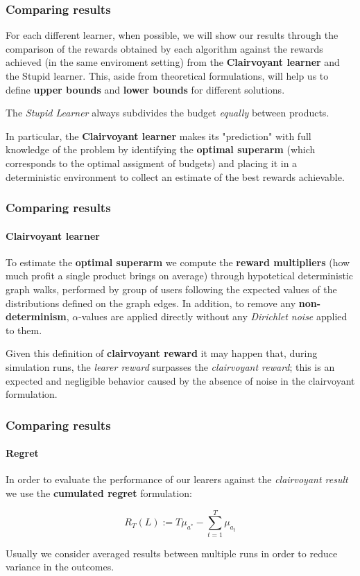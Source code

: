 
\begin{frame}

\frametitle{Comparing results}

For each different learner, when possible, we will show our results through the comparison of the rewards obtained by each algorithm against the rewards achieved (in the same enviroment setting) from the \textbf{Clairvoyant learner} and the Stupid learner.
This, aside from theoretical formulations, will help us to define \textbf{upper bounds} and \textbf{lower bounds} for different solutions.

The \textit{Stupid Learner} always subdivides the budget \textit{equally} between products.

In particular, the \textbf{Clairvoyant learner} makes its "prediction" with full knowledge of the problem by identifying the \textbf{optimal superarm} (which corresponds to the optimal assigment of budgets) and placing it in a deterministic environment to collect an estimate of the best rewards achievable.

\end{frame}


\begin{frame}

\frametitle{Comparing results}
\framesubtitle{Clairvoyant learner}

To estimate the \textbf{optimal superarm} we compute the \textbf{reward multipliers} (how much profit a single product brings on average) through hypotetical deterministic graph walks, performed by group of users following the expected values of the distributions defined on the graph edges.
In addition, to remove any \textbf{non-determinism}, $\alpha$-values are applied directly without any \textit{Dirichlet noise} applied to them.

Given this definition of \textbf{clairvoyant reward} it may happen that, during simulation runs, the \textit{learer reward} surpasses the \textit{clairvoyant reward}; this is an expected and negligible behavior caused by the absence of noise in the clairvoyant formulation.

\end{frame}


\begin{frame}

\frametitle{Comparing results}
\framesubtitle{Regret}

In order to evaluate the performance of our learers against the \textit{clairvoyant result} we use the \textbf{cumulated regret} formulation:

\begin{displaymath}
    R_T(L) := T\mu_{a^*} - \sum_{t = 1}^T \mu_{a_t}
\end{displaymath}

Usually we consider averaged results between multiple runs in order to reduce variance in the outcomes.

\end{frame}

